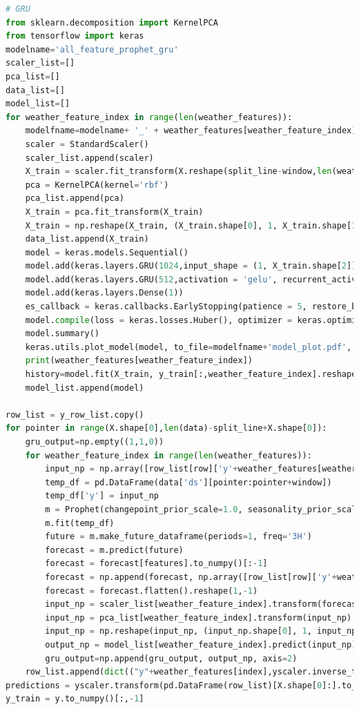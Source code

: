 \documentclass[AutoFakeBold]{LZUThesis}
\begin{document}
\begin{lstlisting}[language = python]
# GRU
from sklearn.decomposition import KernelPCA
from tensorflow import keras
modelname='all_feature_prophet_gru'
scaler_list=[]
pca_list=[]
data_list=[]
model_list=[]
for weather_feature_index in range(len(weather_features)):
    modelfname=modelname+ '_' + weather_features[weather_feature_index]
    scaler = StandardScaler()
    scaler_list.append(scaler)
    X_train = scaler.fit_transform(X.reshape(split_line-window,len(weather_features),window,-1)[:,weather_feature_index].reshape(split_line-window,-1))
    pca = KernelPCA(kernel='rbf')
    pca_list.append(pca)
    X_train = pca.fit_transform(X_train)
    X_train = np.reshape(X_train, (X_train.shape[0], 1, X_train.shape[1]))
    data_list.append(X_train)
    model = keras.models.Sequential()
    model.add(keras.layers.GRU(1024,input_shape = (1, X_train.shape[2]),return_sequences = True))
    model.add(keras.layers.GRU(512,activation = 'gelu', recurrent_activation = 'gelu',return_sequences = True))
    model.add(keras.layers.Dense(1))
    es_callback = keras.callbacks.EarlyStopping(patience = 5, restore_best_weights = True, monitor="loss")
    model.compile(loss = keras.losses.Huber(), optimizer = keras.optimizers.Nadam(0.001))
    model.summary()
    keras.utils.plot_model(model, to_file=modelfname+'model_plot.pdf', show_shapes=True, show_layer_names=True)
    print(weather_features[weather_feature_index])
    history=model.fit(X_train, y_train[:,weather_feature_index].reshape(-1,1), epochs = 10, verbose = 1, shuffle = True, callbacks = [es_callback])
    model_list.append(model)

row_list = y_row_list.copy()
for pointer in range(X.shape[0],len(data)-split_line+X.shape[0]):
    gru_output=np.empty((1,1,0))
    for weather_feature_index in range(len(weather_features)):
        input_np = np.array([row_list[row]['y'+weather_features[weather_feature_index]] for row in range(pointer-window, pointer)])
        temp_df = pd.DataFrame(data['ds'][pointer:pointer+window])
        temp_df['y'] = input_np
        m = Prophet(changepoint_prior_scale=1.0, seasonality_prior_scale=0.1, seasonality_mode='additive', changepoint_range=1, n_changepoints=window-1)
        m.fit(temp_df)
        future = m.make_future_dataframe(periods=1, freq='3H')
        forecast = m.predict(future)
        forecast = forecast[features].to_numpy()[:-1]
        forecast = np.append(forecast, np.array([row_list[row]['y'+weather_features[weather_feature_index]] for row in range(pointer-window, pointer)]).reshape(-1,1), axis=1)
        forecast = forecast.flatten().reshape(1,-1)
        input_np = scaler_list[weather_feature_index].transform(forecast)
        input_np = pca_list[weather_feature_index].transform(input_np)
        input_np = np.reshape(input_np, (input_np.shape[0], 1, input_np.shape[1]))
        output_np = model_list[weather_feature_index].predict(input_np)
        gru_output=np.append(gru_output, output_np, axis=2)
    row_list.append(dict(("y"+weather_features[index],yscaler.inverse_transform(gru_output)[:,:,index][0][0]) for index in range(len(weather_features))))
predictions = yscaler.transform(pd.DataFrame(row_list)[X.shape[0]:].to_numpy()).reshape(-1,1,len(weather_features))
y_train = y.to_numpy()[:,-1]


\end{lstlisting}
\end{document}
